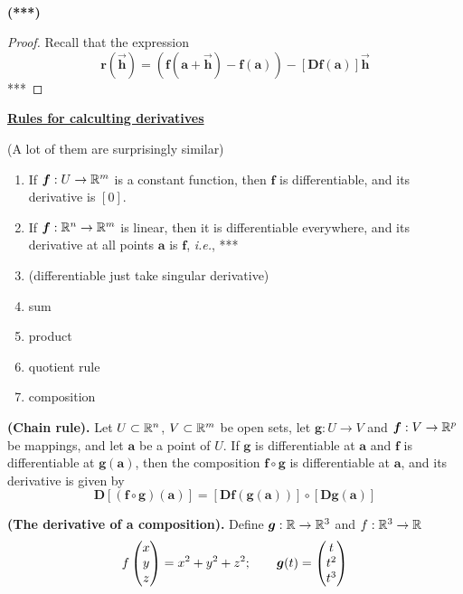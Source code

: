 \\

\begin{proposition}
\textbf{(***)}
\end{proposition}

\begin{proof}
  Recall that the expression
  \[\bm{r}(\vec{\bm{h}})=(\bm{f}(\bm{a}+\vec{\bm{h}})-\bm{f}(\bm{a}))-[\bm{Df}(\bm{a})]\vec{\bm{h}}\]
  ***
\end{proof}

\ul{\textbf{Rules for calculting derivatives}}

(A lot of them are surprisingly similar)
\begin{enumerate}[1.]
  \item If $\bm{f} : U \to \mathbb{R}^m$ is a constant function, then $\bm{f}$ is differentiable, and its derivative is $[0]$.
  \item If $\bm{f} : \mathbb{R}^n \to \mathbb{R}^m$ is linear, then it is differentiable everywhere, and its derivative at all points $\bm{a}$ is $\bm{f}$, \textit{i.e.}, ***
  \item (differentiable just take singular derivative)
  \item sum
  \item product
  \item quotient rule
  \item composition
\end{enumerate}

\begin{theorem}
  \textbf{(Chain rule).} Let $U\subset \mathbb{R}^n$, $V\subset \mathbb{R}^m$ be open sets, let $\bm{g} : U \to V$ and $\bm{f} : V \to \mathbb{R}^p$ be mappings, and let $\bm{a}$ be a point of $U$. If $\bm{g}$ is differentiable at $\bm{a}$ and $\bm{f}$ is differentiable at $\bm{g}(\bm{a})$, then the composition $\bm{f} \circ \bm{g}$ is differentiable at $\bm{a}$, and its derivative is given by
  \[\bm{D}[(\bm{f}\circ \bm{g})(\bm{a})]=[\bm{Df} (\bm{g}(\bm{a}))]\circ [\bm{Dg}(\bm{a})]\]
\end{theorem}

\example
\textbf{(The derivative of a composition).} Define $\bm{g} : \mathbb{R} \to \mathbb{R}^3$ and $f : \mathbb{R}^3 \to \mathbb{R}$
\[f\begin{pmatrix} x \\ y \\ z \end{pmatrix}=x^2+y^2+z^2;\qquad \bm{g}(t)=\begin{pmatrix} t \\ t^2 \\ t^3 \end{pmatrix}\]
